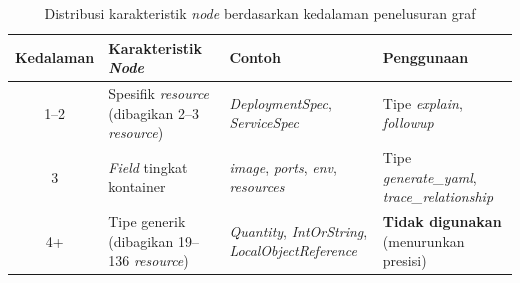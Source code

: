 \renewcommand{\arraystretch}{1.3}
\captionsetup[table]{justification=raggedright,singlelinecheck=false}
\begin{table}[H]
\caption{Distribusi karakteristik \textit{node} berdasarkan kedalaman penelusuran graf}
\label{tbl:hop_justification}
\centering
\begin{tabular}{| c | p{} | p{} | p{} |}
\hline
\textbf{Kedalaman} & \textbf{Karakteristik \textit{Node}} & \textbf{Contoh} & \textbf{Penggunaan} \\
\hline
1--2 & Spesifik \textit{resource} (dibagikan 2--3 \textit{resource}) & \textit{DeploymentSpec}, \textit{ServiceSpec} & Tipe \textit{explain}, \textit{followup} \\
\hline
3 & \textit{Field} tingkat kontainer & \textit{image}, \textit{ports}, \textit{env}, \textit{resources} & Tipe \textit{generate\_yaml}, \textit{trace\_relationship} \\
\hline
4+ & Tipe generik (dibagikan 19--136 \textit{resource}) & \textit{Quantity}, \textit{IntOrString}, \textit{LocalObjectReference} & \textbf{Tidak digunakan} (menurunkan presisi) \\
\hline
\end{tabular}
\end{table}
